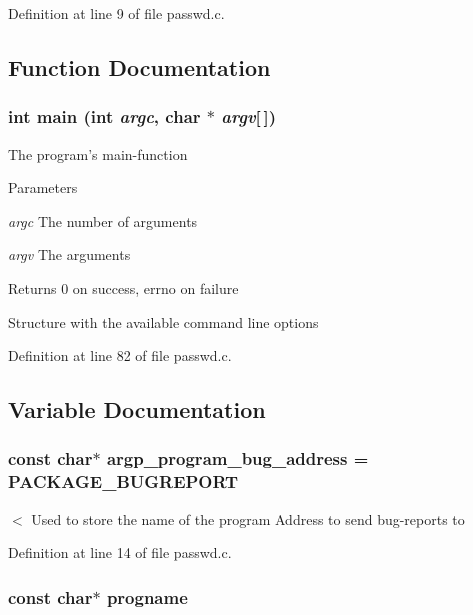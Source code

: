 Definition at line 9 of file passwd.c.



\subsection{Function Documentation}
\subsubsection[{main}]{\setlength{\rightskip}{0pt plus 5cm}int main (int {\em argc}, \/  char $\ast$ {\em argv}[$\,$])}\label{passwd_8c_a0ddf1224851353fc92bfbff6f499fa97}
The program's main-\/function


\begin{DoxyParams}{Parameters}
\item[{\em argc}]The number of arguments \item[{\em argv}]The arguments \end{DoxyParams}
\begin{DoxyReturn}{Returns}
0 on success, errno on failure 
\end{DoxyReturn}


Structure with the available command line options 



Definition at line 82 of file passwd.c.



\subsection{Variable Documentation}
\subsubsection[{argp\_\-program\_\-bug\_\-address}]{\setlength{\rightskip}{0pt plus 5cm}const char$\ast$ {\bf argp\_\-program\_\-bug\_\-address} = PACKAGE\_\-BUGREPORT}\label{passwd_8c_aaa037e59f26a80a8a2e35e6f2364004d}
$<$ Used to store the name of the program Address to send bug-\/reports to 

Definition at line 14 of file passwd.c.

\subsubsection[{progname}]{\setlength{\rightskip}{0pt plus 5cm}const char$\ast$ {\bf progname}}\label{passwd_8c_ad785d8a8f8ff378aa21eb1fa7a6085df}
